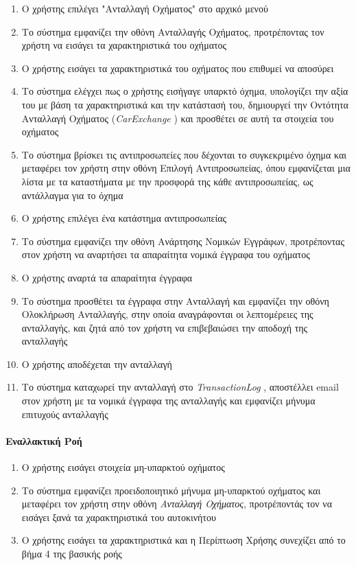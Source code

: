 \documentclass{../ol-softwaremanual}
\begin{document}
	\begin{enumerate}
		\item Ο χρήστης επιλέγει \en"\gr Ανταλλαγή Οχήματος\en" \gr στο αρχικό μενού
		\item Το σύστημα εμφανίζει την οθόνη Ανταλλαγής Οχήματος, προτρέποντας τον χρήστη να εισάγει τα χαρακτηριστικά του οχήματος 
		\item Ο χρήστης εισάγει τα χαρακτηριστικά του οχήματος που επιθυμεί να αποσύρει
		\item Το σύστημα ελέγχει πως ο χρήστης εισήγαγε υπαρκτό όχημα, υπολογίζει την αξία του με βάση τα χαρακτηριστικά και την κατάστασή του, δημιουργεί την Οντότητα Ανταλλαγή Οχήματος (\en \textit{CarExchange} \gr) και προσθέτει σε αυτή τα στοιχεία του οχήματος
		\item Το σύστημα βρίσκει τις αντιπροσωπείες που δέχονται το συγκεκριμένο όχημα και μεταφέρει τον χρήστη στην οθόνη Επιλογή Αντιπροσωπείας, όπου εμφανίζεται μια λίστα με τα καταστήματα με την προσφορά της κάθε αντιπροσωπείας, ως αντάλλαγμα για το όχημα
		\item Ο χρήστης επιλέγει ένα κατάστημα αντιπροσωπείας
		\item Το σύστημα εμφανίζει την οθόνη Ανάρτησης Νομικών Εγγράφων, προτρέποντας στον χρήστη να αναρτήσει τα απαραίτητα νομικά έγγραφα του οχήματος
		\item Ο χρήστης αναρτά τα απαραίτητα έγγραφα		
		\item Το σύστημα προσθέτει τα έγγραφα στην Ανταλλαγή και εμφανίζει την οθόνη Ολοκλήρωση Ανταλλαγής, στην οποία αναγράφονται οι λεπτομέρειες της ανταλλαγής, και ζητά από τον χρήστη να επιβεβαιώσει την αποδοχή της ανταλλαγής
		\item Ο χρήστης αποδέχεται την ανταλλαγή
		\item Το σύστημα καταχωρεί την ανταλλαγή στο \en \textit{TransactionLog} \gr, αποστέλλει \en email \gr στον χρήστη με τα νομικά έγγραφα της ανταλλαγής και εμφανίζει μήνυμα επιτυχούς ανταλλαγής		
	\end{enumerate}
	
	\paragraph{{Εναλλακτική Ροή}}
	
	\begin{enumerate}
		\item Ο χρήστης εισάγει στοιχεία μη-υπαρκτού οχήματος
		\item Το σύστημα εμφανίζει προειδοποιητικό μήνυμα μη-υπαρκτού οχήματος και μεταφέρει τον χρήστη στην οθόνη \textit{Ανταλλαγή Οχήματος}, προτρέποντάς τον να εισάγει ξανά τα χαρακτηριστικά του αυτοκινήτου
		\item Ο χρήστης εισάγει τα χαρακτηριστικά και η Περίπτωση Χρήσης συνεχίζει από το βήμα 4 της βασικής ροής
	\end{enumerate}
	
\end{document}
